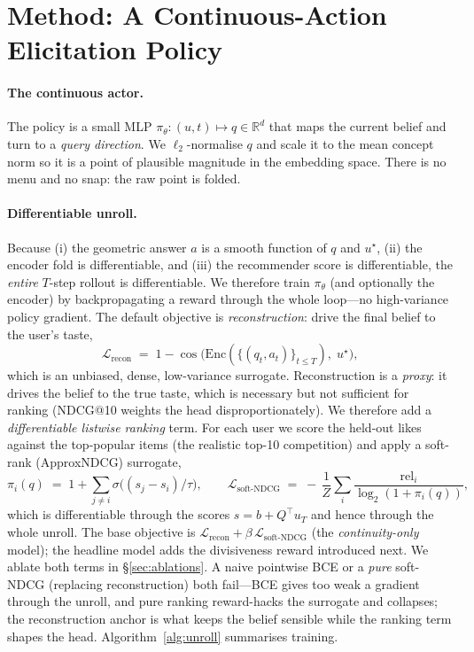 \documentclass[11pt]{article}
\newcommand{\R}{\mathbb{R}}
\newcommand{\ustar}{u^{\star}}
\begin{document}
\section{Method: A Continuous-Action Elicitation Policy}\label{sec:method}
\paragraph{The continuous actor.} The policy is a small MLP $\pi_\theta:(u,t)\mapsto q\in\R^{d}$ that maps the current
belief and turn to a \emph{query direction}. We $\ell_2$-normalise $q$ and scale it to the mean concept norm so it is a
point of plausible magnitude in the embedding space. There is no menu and no snap: the raw point is folded.

\paragraph{Differentiable unroll.} Because (i) the geometric answer $a$ is a smooth function of $q$ and $\ustar$, (ii)
the encoder fold is differentiable, and (iii) the recommender score is differentiable, the \emph{entire} $T$-step
rollout is differentiable. We therefore train $\pi_\theta$ (and optionally the encoder) by backpropagating a reward
through the whole loop---no high-variance policy gradient. The default objective is \emph{reconstruction}: drive the
final belief to the user's taste,
\begin{equation}
  \mathcal{L}_{\text{recon}} \;=\; 1-\cos\!\big(\mathrm{Enc}(\{(q_t,a_t)\}_{t\le T}),\;\ustar\big),
\end{equation}
which is an unbiased, dense, low-variance surrogate. Reconstruction is a \emph{proxy}: it drives the belief to the true
taste, which is necessary but not sufficient for ranking (NDCG@10 weights the head disproportionately). We therefore add
a \emph{differentiable listwise ranking} term. For each user we score the held-out likes against the top-popular items
(the realistic top-10 competition) and apply a soft-rank (ApproxNDCG) surrogate,
\begin{equation}
  \pi_i(q) \;=\; 1+\sum_{j\neq i}\sigma\!\big((s_j-s_i)/\tau\big),\qquad
  \mathcal{L}_{\text{soft-NDCG}} \;=\; -\,\frac{1}{Z}\sum_{i}\frac{\mathrm{rel}_i}{\log_2(1+\pi_i(q))},
\end{equation}
which is differentiable through the scores $s=b+Q^{\top}u_T$ and hence through the whole unroll. The base objective is
$\mathcal{L}_{\text{recon}}+\beta\,\mathcal{L}_{\text{soft-NDCG}}$ (the \emph{continuity-only} model); the headline model
adds the divisiveness reward introduced next. We ablate both terms in \S\ref{sec:ablations}.
A naive pointwise BCE or a \emph{pure} soft-NDCG (replacing reconstruction) both fail---BCE gives too weak a gradient
through the unroll, and pure ranking reward-hacks the surrogate and collapses; the reconstruction anchor is what keeps the
belief sensible while the ranking term shapes the head. Algorithm~\ref{alg:unroll} summarises training.
\end{document}

